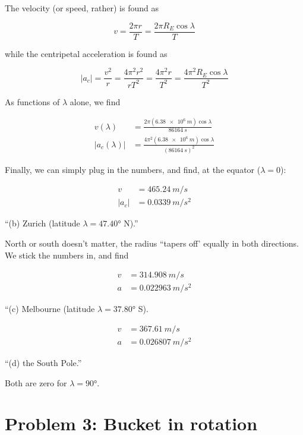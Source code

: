 \documentclass[8.01x]{subfiles}
\begin{document}
The velocity (or speed, rather) is found as

\begin{equation}
v = \frac{2 \pi r}{T} = \frac{2 \pi R_E \cos \lambda}{T}
\end{equation}

while the centripetal acceleration is found as

\begin{equation}
|a_c| = \frac{v^2}{r} = \frac{4 \pi^2 r^2}{r T^2} = \frac{4 \pi^2 r}{T^2} = \frac{4 \pi^2 R_E \cos \lambda}{T^2}
\end{equation}

As functions of $\lambda$ alone, we find

\begin{align}
v(\lambda) &= \frac{2 \pi (\SI{6.38e6}{m}) \cos \lambda}{\SI{86164}{s}}\\
|a_c(\lambda)| &= \frac{4 \pi^2 (\SI{6.38e6}{m}) \cos \lambda}{(\SI{86164}{s})^2}
\end{align}

Finally, we can simply plug in the numbers, and find, at the equator ($\lambda = 0$):

\begin{align}
v &= \SI{465.24}{m/s}\\
|a_c| &= \SI{0.0339}{m/s^2}
\end{align}

``(b) Zurich (latitude $\lambda = \ang{47.40}$ N).''

North or south doesn't matter, the radius ``tapers off' equally in both directions. We stick the numbers in, and find

\begin{align}
v &= \SI{314.908}{m/s}\\
a &= \SI{0.022963}{m/s^2}
\end{align}

``(c) Melbourne (latitude $\lambda = \ang{37.80}$ S).

\begin{align}
v &= \SI{367.61}{m/s}\\
a &= \SI{0.026807}{m/s^2}
\end{align}

``(d) the South Pole.''

Both are zero for $\lambda = \ang{90}$.

\section{Problem 3: Bucket in rotation}
\end{document}
